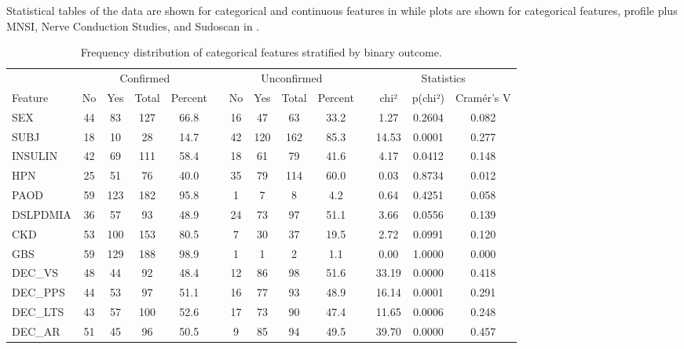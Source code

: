 \documentclass[pdflatex,sn-vancouver-num]{sn-jnl}
\let\cline\cmidrule %
\begin{document}
Statistical tables of the data are shown for categorical and continuous features in  while plots are shown for categorical features, profile plus MNSI, Nerve Conduction Studies, and Sudoscan in . 


\begin{table}[h!]
\centering
\footnotesize
\begin{tabular}{lccccccccccccc}
\toprule
& \multicolumn{4}{c}{Confirmed} && \multicolumn{4}{c}{Unconfirmed} && \multicolumn{3}{c}{Statistics} \\       
\cline{2-5} \cline{7-10} \cline{12-14}
Feature     & No & Yes  & Total & Percent && No & Yes  & Total  & Percent && chi² & p(chi²)  & Cramér's V \\
\midrule
SEX & 44 & 83 & 127 & 66.8 && 16 & 47 & 63 & 33.2 && 1.27     & 0.2604 & 0.082 \\
SUBJ & 18 & 10 & 28 & 14.7 && 42 & 120 & 162 & 85.3 && 14.53  & 0.0001 & 0.277 \\
INSULIN & 42 & 69 & 111 & 58.4 && 18 & 61 & 79 & 41.6 && 4.17 & 0.0412 & 0.148 \\
\midrule
HPN         & 25 & 51   & 76    & 40.0    && 35 & 79   & 114    & 60.0    && 0.03 & 0.8734 & 0.012 \\
PAOD        & 59 & 123  & 182   & 95.8    && 1  & 7    & 8      & 4.2     && 0.64 & 0.4251 & 0.058 \\
DSLPDMIA    & 36 & 57   & 93    & 48.9    && 24 & 73   & 97     & 51.1    && 3.66 & 0.0556 & 0.139 \\
CKD         & 53 & 100  & 153   & 80.5    && 7  & 30   & 37     & 19.5    && 2.72 & 0.0991 & 0.120 \\
GBS         & 59 & 129  & 188   & 98.9    && 1  & 1    & 2      & 1.1     && 0.00 & 1.0000 & 0.000 \\
\midrule
DEC\_VS & 48 & 44 & 92 & 48.4 && 12 & 86 & 98 & 51.6 && 33.19   & 0.0000 & 0.418 \\
DEC\_PPS & 44 & 53 & 97 & 51.1 && 16 & 77 & 93 & 48.9 && 16.14  & 0.0001 & 0.291 \\
DEC\_LTS & 43 & 57 & 100 & 52.6 && 17 & 73 & 90 & 47.4 && 11.65 & 0.0006 & 0.248 \\
DEC\_AR & 51 & 45 & 96 & 50.5 && 9 & 85 & 94 & 49.5 && 39.70    & 0.0000 & 0.457 \\
\bottomrule
\end{tabular}
\caption{Frequency distribution of categorical features stratified by binary outcome.
} 
\label{tab:categorical}
\end{table}
\end{document}
